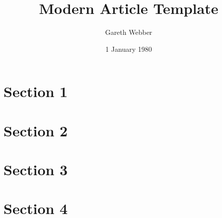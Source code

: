 \documentclass[11pt]{article}
\begin{document}
\title{Modern Article Template}
\date{1 January 1980}
\author{Gareth Webber}
\covertext{\lipsum[1]}
\maketitle

\section{Section 1}
\lipsum[6-10]
\section{Section 2}
\lipsum[11-15]
\section{Section 3}
\lipsum[16-20]
\section{Section 4}
\lipsum[20-24]
\end{document}

